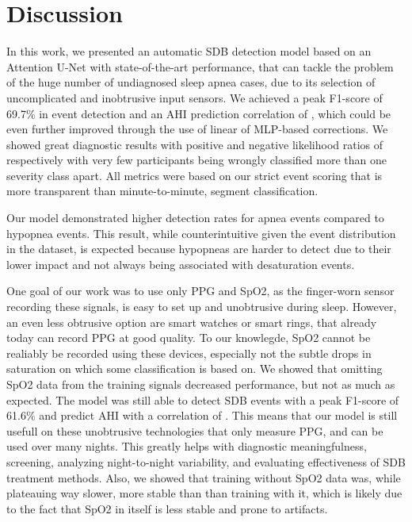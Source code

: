 \chapter{Discussion \label{Chapter-Discussion}}


In this work, we presented an automatic SDB detection model based on an Attention U-Net with state-of-the-art performance, that can tackle the problem of the huge number of undiagnosed sleep apnea cases, due to its selection of uncomplicated and inobtrusive input sensors. We achieved a peak F1-score of 69.7\% in event detection and an AHI prediction correlation of , which could be even further improved through the use of linear of MLP-based corrections. We showed great diagnostic results with positive and negative likelihood ratios of  respectively with very few participants being wrongly classified more than one severity class apart. All metrics were based on our strict event scoring that is more transparent than minute-to-minute, segment classification.

Our model demonstrated higher detection rates for apnea events compared to hypopnea events. This result, while counterintuitive given the event distribution in the dataset, is expected because hypopneas are harder to detect due to their lower impact and not always being associated with desaturation events.

One goal of our work was to use only PPG and SpO2, as the finger-worn sensor recording these signals, is easy to set up and unobtrusive during sleep. However, an even less obtrusive option are smart watches or smart rings, that already today can record PPG at good quality. To our knowlegde, SpO2 cannot be realiably be recorded using these devices, especially not the subtle drops in saturation on which some classification is based on. 
We showed that omitting SpO2 data from the training signals decreased performance, but not as much as expected. The model was still able to detect SDB events with a peak F1-score of 61.6\% and predict AHI with a correlation of . This means that our model is still usefull on these unobtrusive technologies that only measure PPG, and can be used over many nights. This greatly helps with diagnostic meaningfulness, screening, analyzing night-to-night variability, and evaluating effectiveness of SDB treatment methods.
Also, we showed that training without SpO2 data was, while plateauing way slower, more stable than than training with it, which is likely due to the fact that SpO2 in itself is less stable and prone to artifacts. 

